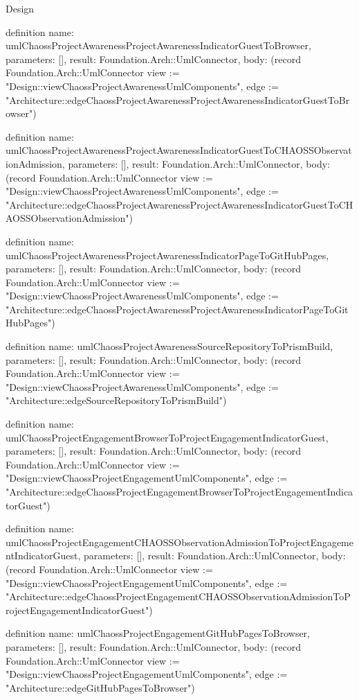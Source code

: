 \begin{lexlean}{Design}
\begin{semanticmodule}
definition{
  name: umlChaossProjectAwarenessProjectAwarenessIndicatorGuestToBrowser,
  parameters: [],
  result: Foundation.Arch::UmlConnector,
  body: (record Foundation.Arch::UmlConnector {view := "Design::viewChaossProjectAwarenessUmlComponents", edge := "Architecture::edgeChaossProjectAwarenessProjectAwarenessIndicatorGuestToBrowser"})
}

definition{
  name: umlChaossProjectAwarenessProjectAwarenessIndicatorGuestToCHAOSSObservationAdmission,
  parameters: [],
  result: Foundation.Arch::UmlConnector,
  body: (record Foundation.Arch::UmlConnector {view := "Design::viewChaossProjectAwarenessUmlComponents", edge := "Architecture::edgeChaossProjectAwarenessProjectAwarenessIndicatorGuestToCHAOSSObservationAdmission"})
}

definition{
  name: umlChaossProjectAwarenessProjectAwarenessIndicatorPageToGitHubPages,
  parameters: [],
  result: Foundation.Arch::UmlConnector,
  body: (record Foundation.Arch::UmlConnector {view := "Design::viewChaossProjectAwarenessUmlComponents", edge := "Architecture::edgeChaossProjectAwarenessProjectAwarenessIndicatorPageToGitHubPages"})
}

definition{
  name: umlChaossProjectAwarenessSourceRepositoryToPrismBuild,
  parameters: [],
  result: Foundation.Arch::UmlConnector,
  body: (record Foundation.Arch::UmlConnector {view := "Design::viewChaossProjectAwarenessUmlComponents", edge := "Architecture::edgeSourceRepositoryToPrismBuild"})
}

definition{
  name: umlChaossProjectEngagementBrowserToProjectEngagementIndicatorGuest,
  parameters: [],
  result: Foundation.Arch::UmlConnector,
  body: (record Foundation.Arch::UmlConnector {view := "Design::viewChaossProjectEngagementUmlComponents", edge := "Architecture::edgeChaossProjectEngagementBrowserToProjectEngagementIndicatorGuest"})
}

definition{
  name: umlChaossProjectEngagementCHAOSSObservationAdmissionToProjectEngagementIndicatorGuest,
  parameters: [],
  result: Foundation.Arch::UmlConnector,
  body: (record Foundation.Arch::UmlConnector {view := "Design::viewChaossProjectEngagementUmlComponents", edge := "Architecture::edgeChaossProjectEngagementCHAOSSObservationAdmissionToProjectEngagementIndicatorGuest"})
}

definition{
  name: umlChaossProjectEngagementGitHubPagesToBrowser,
  parameters: [],
  result: Foundation.Arch::UmlConnector,
  body: (record Foundation.Arch::UmlConnector {view := "Design::viewChaossProjectEngagementUmlComponents", edge := "Architecture::edgeGitHubPagesToBrowser"})
}


\end{semanticmodule}
\end{lexlean}
